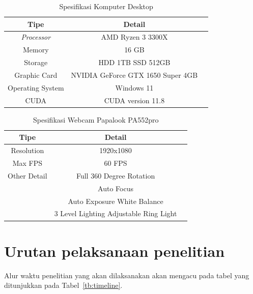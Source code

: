 \begin{longtable}{|c|c|c|}
  \caption{Spesifikasi Komputer Desktop}
  \label{tb:spesifikasikomputer}                         \\
  \hline
  \textbf{Tipe}      & \textbf{Detail}                   \\
  \hline
  \textit{Processor} & AMD Ryzen 3 3300X                 \\
  Memory             & 16 GB                             \\
  Storage            & HDD 1TB SSD 512GB                 \\
  Graphic Card       & NVIDIA GeForce GTX 1650 Super 4GB \\
  Operating System   & Windows 11                        \\
  CUDA               & CUDA version 11.8                 \\
  \hline
\end{longtable}

\begin{longtable}{|c|c|c|}
  \caption{Spesifikasi Webcam Papalook PA552pro}
  \label{tb:spesifikasiwebcam}                           \\
  \hline
  \textbf{Tipe} & \textbf{Detail}                        \\
  \hline
  Resolution    & 1920x1080                              \\
  Max FPS       & 60 FPS                                 \\
  Other Detail  & Full 360 Degree Rotation               \\
                & Auto Focus                             \\
                & Auto Exposure White Balance            \\
                & 3 Level Lighting Adjustable Ring Light \\
  \hline
\end{longtable}

\newpage

\section{Urutan pelaksanaan penelitian}

Alur waktu penelitian yang akan dilaksanakan akan mengacu pada tabel yang ditunjukkan pada Tabel~\ref{tb:timeline}.

